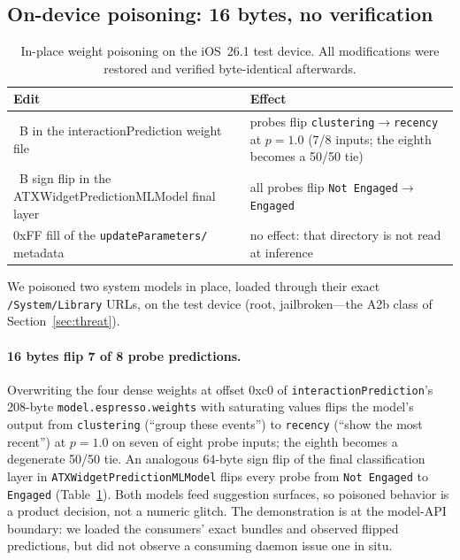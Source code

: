 \documentclass[letterpaper,twocolumn,10pt]{article}
\begin{document}
\subsection{On-device poisoning: 16 bytes, no verification}
\label{sec:poisoning}

\begin{table}[t]
\centering
\caption{In-place weight poisoning on the iOS~26.1 test device. All
modifications were restored and verified byte-identical afterwards.}
\label{tab:poison}
\scriptsize
\setlength{\tabcolsep}{4pt}
\begin{tabular}{@{}>{\raggedright\arraybackslash}p{2.4cm}>{\raggedright\arraybackslash}p{4.6cm}@{}}
\toprule
\textbf{Edit} & \textbf{Effect} \\
\midrule
16~B in the interactionPrediction weight file & probes flip \texttt{clustering}$\rightarrow$\texttt{recency} at $p{=}1.0$ (7/8 inputs; the eighth becomes a 50/50 tie) \\
64~B sign flip in the ATXWidgetPredictionMLModel final layer & all probes flip \texttt{Not Engaged}$\rightarrow$\texttt{Engaged} \\
0xFF fill of the \texttt{update}\allowbreak\texttt{Parameters/} metadata & no effect: that directory is not read at inference \\
\bottomrule
\end{tabular}
\end{table}

We poisoned two system models in place, loaded through their exact
\texttt{/System/Library} URLs, on the test device (root, jailbroken---the
A2b class of Section~\ref{sec:threat}).

\paragraph{16 bytes flip 7 of 8 probe predictions.}
Overwriting the four dense weights at offset 0xc0 of
\texttt{interaction}\allowbreak\texttt{Prediction}'s 208-byte \texttt{model.}\allowbreak\texttt{espresso.}\allowbreak\texttt{weights}
with saturating values flips the model's output from
\texttt{clustering} (``group these events'') to \texttt{recency}
(``show the most recent'') at $p=1.0$ on seven of eight probe
inputs; the eighth becomes a degenerate 50/50 tie.
An analogous 64-byte sign flip of the final classification layer in
\texttt{ATXWidget}\allowbreak\texttt{Prediction}\allowbreak\texttt{MLModel} flips every probe from
\texttt{Not Engaged} to \texttt{Engaged} (Table~\ref{tab:poison}).
Both models feed suggestion surfaces, so poisoned behavior is a product
decision, not a numeric glitch.
The demonstration is at the model-API boundary: we loaded the consumers'
exact bundles and observed flipped predictions, but did not observe a
consuming daemon issue one in situ.
\end{document}
